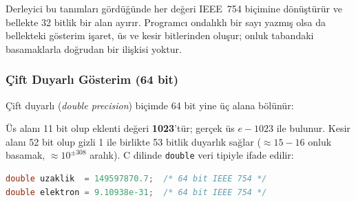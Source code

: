 Derleyici bu tanımları gördüğünde her değeri IEEE~754 biçimine dönüştürür ve bellekte 32 bitlik bir alan ayırır. Programcı ondalıklı bir sayı yazmış olsa da bellekteki gösterim işaret, üs ve kesir bitlerinden oluşur; onluk tabandaki basamaklarla doğrudan bir ilişkisi yoktur.

\subsubsection{Çift Duyarlı Gösterim (64 bit)}

Çift duyarlı (\emph{double precision}) biçimde 64 bit yine üç alana bölünür:

\begin{center}
\end{center}

Üs alanı 11 bit olup eklenti değeri \textbf{1023}'tür; gerçek üs $e - 1023$ ile bulunur. Kesir alanı 52 bit olup gizli 1 ile birlikte 53 bitlik duyarlık sağlar ($\approx 15{-}16$ onluk basamak, $\approx 10^{\pm 308}$ aralık). C dilinde \texttt{double} veri tipiyle ifade edilir:

\begin{lstlisting}[language=C, xleftmargin=2em]
double uzaklik  = 149597870.7;  /* 64 bit IEEE 754 */
double elektron = 9.10938e-31;  /* 64 bit IEEE 754 */
\end{lstlisting}

